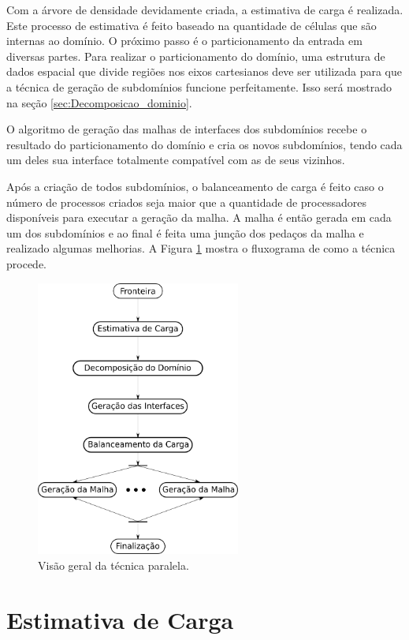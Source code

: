 Com a árvore de densidade devidamente criada, a estimativa de carga é realizada. Este processo de estimativa é feito baseado na quantidade de células que são internas ao domínio. O próximo passo é o particionamento da entrada em diversas partes. Para realizar o particionamento do domínio, uma estrutura de dados espacial que divide regiões nos eixos cartesianos deve ser utilizada para que a técnica de geração de subdomínios funcione perfeitamente. Isso será mostrado na seção \ref{sec:Decomposicao_dominio}.

O algoritmo de geração das malhas de interfaces dos subdomínios recebe o resultado do particionamento do domínio e cria os novos subdomínios, tendo cada um deles sua interface totalmente compatível com as de seus vizinhos.

Após a criação de todos subdomínios, o balanceamento de carga é feito caso o número de processos criados seja maior que a quantidade de processadores disponíveis para executar a geração da malha. A malha é então gerada em cada um dos subdomínios e ao final é feita uma junção dos pedaços da malha e realizado algumas melhorias. A Figura \ref{fig:fluxograma} mostra o fluxograma de como a técnica procede.

\begin{figure}[!ht]
	\centering
	\includegraphics[width=0.6\textwidth]{fig/fluxograma.png}
	\caption{Visão geral da técnica paralela.}
	\label{fig:fluxograma}
\end{figure}


\section{Estimativa de Carga} 
\label{sec:Estimativa_de_Carga}

